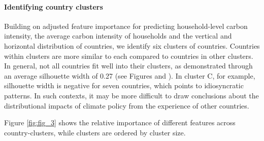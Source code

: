 \documentclass[12pt, a4paper]{article}
\begin{document}
\paragraph{Identifying country clusters}

Building on adjusted feature importance for predicting household-level carbon intensity, the average carbon intensity of households and the vertical and horizontal distribution of countries, we identify six clusters of countries. Countries within clusters are more similar to each compared to countries in other clusters. In general, not all countries fit well into their clusters, as demonstrated through an average silhouette width of 0.27 (see Figures  and ). In cluster C, for example, silhouette width is negative for seven countries, which points to idiosyncratic patterns. In such contexts, it may be more difficult to draw conclusions about the distributional impacts of climate policy from the experience of other countries. 

Figure \ref{fig:fig_3} shows the relative importance of different features across country-clusters, while clusters are ordered by cluster size. 
\end{document}
